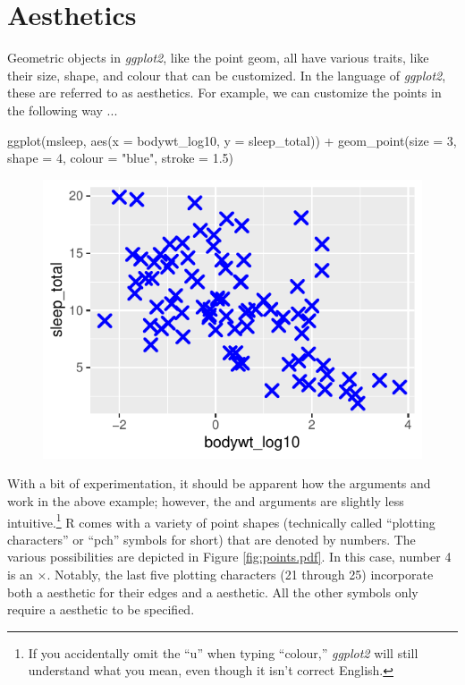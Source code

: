 \section{Aesthetics}

Geometric objects in \textit{ggplot2}, like the point geom, all have various traits, like their size, shape, and colour that can be customized.  In the language of \textit{ggplot2}, these are referred to as \gls{aesthetics}.  For example, we can customize the points in the following way ...

\begin{inR}
ggplot(msleep, aes(x = bodywt_log10, y = sleep_total)) +
  geom_point(size = 3, 
             shape = 4, 
             colour = "blue", 
             stroke = 1.5)
\end{inR}

\vspace{2em}

\begin{figure}[H]
\includegraphics[scale = 0.75]{graphics/ch2Figs/ggEx_5.pdf}
\end{figure}

With a bit of experimentation, it should be apparent how the arguments  and  work in the above example; however, the  and  arguments are slightly less intuitive.\footnote{If you accidentally omit the ``u'' when typing ``colour,'' \textit{ggplot2} will still understand what you mean, even though it isn't correct English.} R comes with a variety of point shapes (technically called ``plotting characters'' or ``\gls{pch}'' symbols for short) that are denoted by numbers. The various possibilities are depicted in Figure \ref{fig:points.pdf}.  In this case, number 4 is an $\times$.  Notably, the last five plotting characters (21 through 25) incorporate both a  aesthetic for their edges and a  aesthetic. All the other symbols only require a  aesthetic to be specified.

